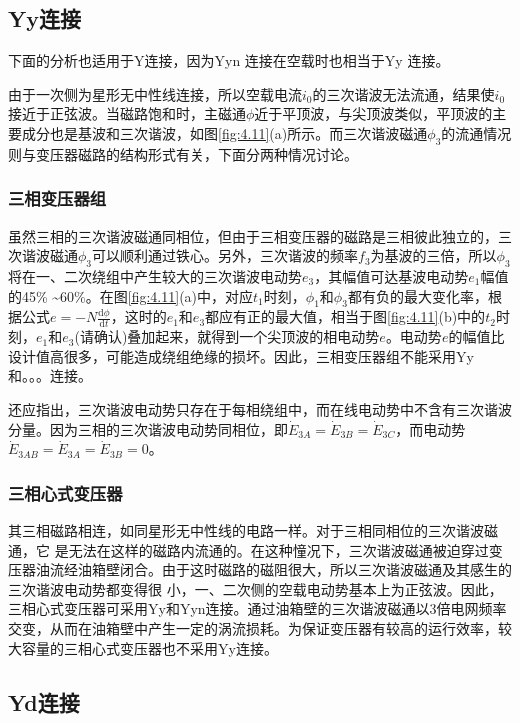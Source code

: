 \documentclass{book}
\begin{document}
\subsection{Yy连接}
下面的分析也适用于Y连接，因为Yyn 连接在空载时也相当于Yy 连接。

由于一次侧为星形无中性线连接，所以空载电流${{i}_{0}}$的三次谐波无法流通，结果使${{i}_{0}}$接近于正弦波。当磁路饱和时，主磁通$\phi $近于平顶波，与尖顶波类似，平顶波的主要成分也是基波和三次谐波，如图\ref{fig:4.11}(a)所示。而三次谐波磁通${{\phi }_{3}}$的流通情况则与变压器磁路的结构形式有关，下面分两种情况讨论。


\subsubsection{三相变压器组}
虽然三相的三次谐波磁通同相位，但由于三相变压器的磁路是三相彼此独立的，三次谐波磁通${{\phi }_{3}}$可以顺利通过铁心。另外，三次谐波的频率${{f}_{3}}$为基波的三倍，所以${{\phi }_{3}}$将在一、二次绕组中产生较大的三次谐波电动势${{e}_{3}}$，其幅值可达基波电动势${{e}_{1}}$幅值的45\% \textasciitilde60\%。在图\ref{fig:4.11}(a)中，对应${{t}_{1}}$时刻，${{\phi }_{1}}$和${{\phi }_{3}}$都有负的最大变化率，根据公式$e=-N\frac{\text{d}\phi }{\text{d}t}$，这时的${{e}_{1}}$和${{e}_{3}}$都应有正的最大值，相当于图\ref{fig:4.11}(b)中的${{t}_{2}}$时刻，${{e}_{1}}$和${{e}_{3}}$(请确认)叠加起来，就得到一个尖顶波的相电动势$e$。电动势$e$的幅值比设计值高很多，可能造成绕组绝缘的损坏。因此，三相变压器组不能采用Yy和。。。连接。

还应指出，三次谐波电动势只存在于每相绕组中，而在线电动势中不含有三次谐波分量。因为三相的三次谐波电动势同相位，即${{\dot{E}}_{3A}}={{\dot{E}}_{3B}}={{\dot{E}}_{3C}}$，而电动势${{\dot{E}}_{3AB}}={{\dot{E}}_{3A}}={{\dot{E}}_{3B}}=0$。

\subsubsection{三相心式变压器}

其三相磁路相连，如同星形无中性线的电路一样。对于三相同相位的三次谐波磁通，它 是无法在这样的磁路内流通的。在这种憧况下，三次谐波磁通被迫穿过变压器油流经油箱壁闭合。由于这时磁路的磁阻很大，所以三次谐波磁通及其感生的三次谐波电动势都变得很 小，一、二次侧的空载电动势基本上为正弦波。因此，三相心式变压器可采用Yy和Yyn连接。通过油箱壁的三次谐波磁通以3倍电网频率交变，从而在油箱壁中产生一定的涡流损耗。为保证变压器有较高的运行效率，较大容量的三相心式变压器也不采用Yy连接。

\subsection{Yd连接}
\end{document}
